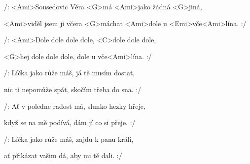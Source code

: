

\zs
/: <Ami>Sousedovic Věra <G>má
<Ami>jako žádná <G>jiná,

<Ami>viděl jsem ji včera <G>máchat
<Ami>dole u <Emi>vče<Ami>lína. :/
\ks

\zr
/: <Ami>Dole dole dole dole, <C>dole dole dole,

<G>hej dole dole dole, dole u vče<Ami>lína. :/
\kr

\zs
/: Líčka jako růže máš,
já tě musím dostat,

nic ti nepomůže spát,
skočím třeba do sna. :/
\ks

\zr \kr

\zs
/: Ať v poledne radost má,
slunko hezky hřeje,

když se na mě podívá,
dám jí co si přeje. :/
\ks

\zr \kr

\zs
/: Líčka jako růže máš,
zajdu k panu králi,

ať přikázat vašim dá,
aby mi tě dali. :/
\ks

\zr \kr

\kp
